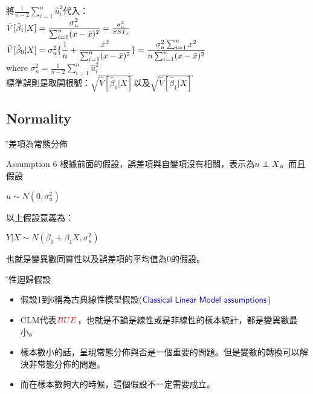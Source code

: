 \documentclass[xcolor=dvipsnames]{beamer}
\newcommand\independent{\protect\mathpalette{\protect\independenT}{\perp}}
\def\independenT#1#2{\mathrel{\rlap{$#1#2$}\mkern2mu{#1#2}}}
\begin{document}
\begin{frame}
將$ \frac{1}{n-2}\sum\limits_{i=1}^{n}\hat{u}_{i}^2 $代入：\\
$\hat{V}[\hat{\beta}_{1}|X]=\mathlarger{\frac{\sigma_{u}^{2}}{\sum_{i=1}^{n}(x-\bar{x})^2}}=\frac{\sigma_{u}^{2}}{SST_{x}}$\\
$\hat{V}[\hat{\beta}_{0}|X]=\sigma_{u}^{2}\mathlarger{\{\frac{1}{n}+\frac{\bar{x}^2}{\sum_{i=1}^{n}(x-\bar{x})^2}}\}=\mathlarger{\frac{\sigma_{u}^2\sum_{i=1}^{n}x^2}{n\sum_{i=1}^{n}(x-\bar{x})^2}}$\\
$\mathrm{where}$ $\sigma_{u}^{2}=\frac{1}{n-2}\sum\limits_{i=1}^{n}\hat{u}_{i}^2$\\
\medskip
標準誤則是取開根號：$\sqrt{\hat{V}[\hat{\beta}_{0}|X]} $以及$\sqrt{\hat{V}[\hat{\beta}_{1}|X]}$
\end{frame}
\subsection{Normality}
\begin{frame}{\H 誤差項為常態分佈}
\begin{block}{Assumption 6}
根據前面的假設，誤差項與自變項沒有相關，表示為$ u\independent X $。而且假設
\begin{center}
$u\sim N(0,\sigma_{u}^{2})  $
\end{center}
以上假設意義為：
\begin{center}
$  Y|X \sim N(\beta_{0}+\beta_{1}X, \sigma_{u}^{2})$
\end{center}
也就是變異數同質性以及誤差項的平均值為0的假設。
\end{block}
\end{frame}
\begin{frame}{\H 線性迴歸假設}
\begin{itemize}
\item 假設1到6稱為古典線性模型假設($\textcolor{blue}{\textsf {Classical Linear Model assumptions}} $)
\item CLM代表$\textcolor{red}{BUE}$，也就是不論是線性或是非線性的樣本統計，都是變異數最小。
\item 樣本數小的話，呈現常態分佈與否是一個重要的問題。但是變數的轉換可以解決非常態分佈的問題。
\item 而在樣本數夠大的時候，這個假設不一定需要成立。
\end{itemize}
\end{frame}
\end{document}
